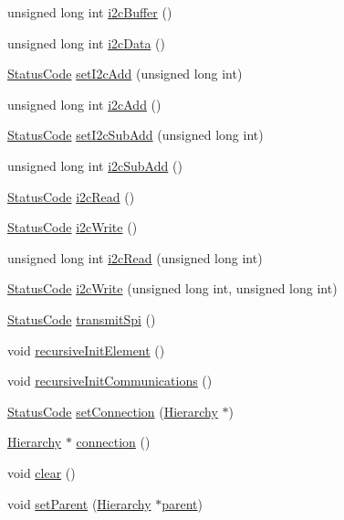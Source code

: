 \begin{DoxyCompactItemize}
unsigned long int \hyperlink{classFePGA_a5577463c8478cb6d54fc3c75b26cd819}{i2c\+Buffer} ()
\item 
unsigned long int \hyperlink{classFePGA_a9c261a09d323c07ec4b9e925d4dfc353}{i2c\+Data} ()
\item 
\hyperlink{classStatusCode}{Status\+Code} \hyperlink{classFePGA_a2da860f836e04ecc54056d0bf8cc8f98}{set\+I2c\+Add} (unsigned long int)
\item 
unsigned long int \hyperlink{classFePGA_a26b690b730b5f668ab28fb8deab8326b}{i2c\+Add} ()
\item 
\hyperlink{classStatusCode}{Status\+Code} \hyperlink{classFePGA_a37c1ee5bf89667c641f321479697166f}{set\+I2c\+Sub\+Add} (unsigned long int)
\item 
unsigned long int \hyperlink{classFePGA_ab51ac1c71e33f7444212de0e89e1f436}{i2c\+Sub\+Add} ()
\item 
\hyperlink{classStatusCode}{Status\+Code} \hyperlink{classFePGA_a939c5c23077210a2ad851a12694657a4}{i2c\+Read} ()
\item 
\hyperlink{classStatusCode}{Status\+Code} \hyperlink{classFePGA_a27b9c9bb486cea35b1bbcac5da96f527}{i2c\+Write} ()
\item 
unsigned long int \hyperlink{classFePGA_adf1c43786131d0f500b4662a877229c7}{i2c\+Read} (unsigned long int)
\item 
\hyperlink{classStatusCode}{Status\+Code} \hyperlink{classFePGA_a45e1cfdf1f303f3958bf6a83c4e8039b}{i2c\+Write} (unsigned long int, unsigned long int)
\item 
\hyperlink{classStatusCode}{Status\+Code} \hyperlink{classFePGA_ac7698a9f59f7290a6bb648030976597f}{transmit\+Spi} ()
\item 
void \hyperlink{classElement_a3c0abcb36f8906688bb7e32608df7086}{recursive\+Init\+Element} ()
\item 
void \hyperlink{classElement_a82119ed37dff76508a2746a853ec35ba}{recursive\+Init\+Communications} ()
\item 
\hyperlink{classStatusCode}{Status\+Code} \hyperlink{classElement_ab476b4b1df5954141ceb14f072433b89}{set\+Connection} (\hyperlink{classHierarchy}{Hierarchy} $\ast$)
\item 
\hyperlink{classHierarchy}{Hierarchy} $\ast$ \hyperlink{classElement_af57444353c1ddf9fa0109801e97debf7}{connection} ()
\item 
void \hyperlink{classHierarchy_af4d43b0765b402670eed2d62c73405af}{clear} ()
\item 
void \hyperlink{classHierarchy_a585ad1aeec16077a0e532ab8b4fc557b}{set\+Parent} (\hyperlink{classHierarchy}{Hierarchy} $\ast$\hyperlink{classHierarchy_a1c7bec8257e717f9c1465e06ebf845fc}{parent})

\end{DoxyCompactItemize}
